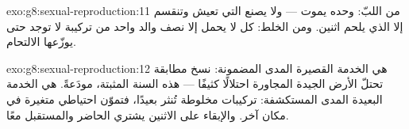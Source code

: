 \begin{solution}{exo:g8:sexual-reproduction:11}
من اللبّ:  وحده يموت --- ولا يصنع  التي تعيش وتنقسم
إلا  الذي يلحم اثنين. ومن الخلط: كل  لا يحمل إلا نصف
والد واحد من تركيبة لا توجد حتى يوزّعها الالتحام.
\end{solution}

\begin{solution}{exo:g8:sexual-reproduction:12}
 هي الخدمة القصيرة المدى المضمونة: نسخ مطابقة تحتلّ الأرض
الجيدة المجاورة احتلالًا كثيفًا ---  هذه السنة المثبتة،
مودَعةً.  هي الخدمة البعيدة المدى المستكشفة: تركيبات مخلوطة
تُنثر بعيدًا، فتموّن احتياطي   متغيرة في مكان آخر.
والإبقاء على الاثنين يشتري الحاضر والمستقبل معًا.
\end{solution}


